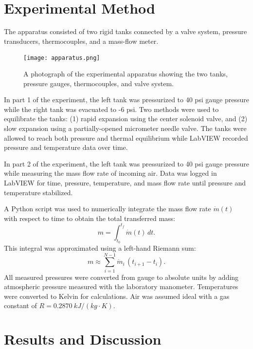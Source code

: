 \documentclass[12pt]{article}
\begin{document}
\section*{Experimental Method}
The apparatus consisted of two rigid tanks connected by a valve system, pressure transducers, thermocouples, and a mass-flow meter.

\begin{figure}[h!]
\centering
\texttt{[image: apparatus.png]}
\caption{A photograph of the experimental apparatus showing the two tanks, pressure gauges, thermocouples, and valve system.}
\label{fig:apparatus}
\end{figure}

In part 1 of the experiment, the left tank was pressurized to 40 psi gauge pressure while the right tank was evacuated to -6 psi.
Two methods were used to equilibrate the tanks:
(1) rapid expansion using the center solenoid valve, and
(2) slow expansion using a partially-opened micrometer needle valve.
The tanks were allowed to reach both pressure and thermal equilibrium while LabVIEW recorded pressure and temperature data over time.

In part 2 of the experiment, the left tank was pressurized to 40 psi gauge pressure while measuring the mass flow rate of incoming air. 
Data was logged in LabVIEW for time, pressure, temperature, and mass flow rate until pressure and temperature stabilized.

A Python script was used to numerically integrate the mass flow rate \(\dot m(t)\) with respect to time to obtain the total transferred mass:
\[
m = \int_{t_0}^{t_f} \dot m(t)\,dt.
\]
This integral was approximated using a left-hand Riemann sum:
\[
m \approx \sum_{i=1}^{N-1} \dot m_i \,(t_{i+1}-t_i).
\]
All measured pressures were converted from gauge to absolute units by adding atmospheric pressure measured with the laboratory manometer. Temperatures were converted to Kelvin for calculations. Air was assumed ideal with a gas constant of \(R = 0.2870~\si{kJ/(kg\cdot K)}\).

\section*{Results and Discussion}
\end{document}
